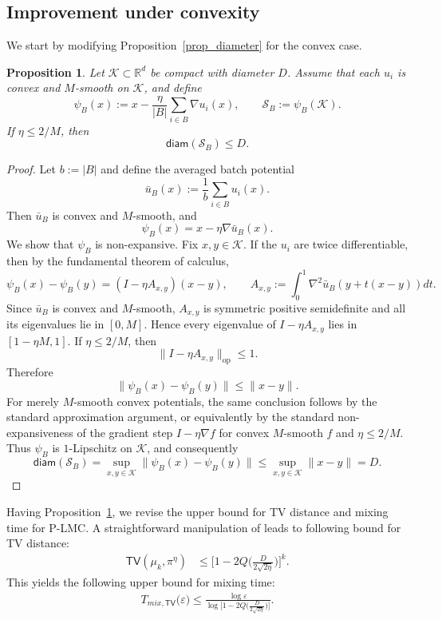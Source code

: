 \documentclass[10pt, journal]{IEEEtran}
\makeatletter
\def\eqref#1{equation~\ref{#1}}
\renewcommand{\eqref}[1]{\textup{\tagform@{\ref{#1}}}}
\newtheorem{proposition}{Proposition}
\makeatother
\begin{document}
\subsection{Improvement under convexity}
\label{app:convex}
We start by modifying Proposition~\ref{prop_diameter} for the convex case.

\begin{proposition}
\label{prop_diameter_convex}
Let $\mathcal K\subset\mathbb R^d$ be compact with diameter $D$. Assume that each $u_i$ is convex and $M$-smooth on $\mathcal K$, and define
$$\psi_B(x):=x-\frac{\eta}{|B|}\sum_{i\in B}\nabla u_i(x),\qquad \mathcal S_B:=\psi_B(\mathcal K).$$
If $\eta\le 2/M$, then
$$\mathsf{diam}(\mathcal S_B)\le D.$$
\end{proposition}
\begin{proof}
Let $b:=|B|$ and define the averaged batch potential
$$\bar u_B(x):=\frac1b\sum_{i\in B}u_i(x).$$
Then $\bar u_B$ is convex and $M$-smooth, and
$$\psi_B(x)=x-\eta\nabla\bar u_B(x).$$
We show that $\psi_B$ is non-expansive. Fix $x,y\in\mathcal K$. If the $u_i$ are twice differentiable, then by the fundamental theorem of calculus,
$$\psi_B(x)-\psi_B(y)=\left(I-\eta A_{x,y}\right)(x-y),\qquad A_{x,y}:=\int_0^1 \nabla^2\bar u_B(y+t(x-y))dt.$$
Since $\bar u_B$ is convex and $M$-smooth, $A_{x,y}$ is symmetric positive semidefinite and all its eigenvalues lie in $[0,M]$. Hence every eigenvalue of $I-\eta A_{x,y}$ lies in $[1-\eta M,1]$. If $\eta\le2/M$, then
$$\|I-\eta A_{x,y}\|_{\mathrm{op}}\le1.$$
Therefore
$$\|\psi_B(x)-\psi_B(y)\|\le \|x-y\|.$$
For merely $M$-smooth convex potentials, the same conclusion follows by the standard approximation argument, or equivalently by the standard non-expansiveness of the gradient step $I-\eta\nabla f$ for convex $M$-smooth $f$ and $\eta\le2/M$.
Thus $\psi_B$ is $1$-Lipschitz on $\mathcal K$, and consequently
$$\mathsf{diam}(\mathcal S_B)=\sup_{x,y\in\mathcal K}\|\psi_B(x)-\psi_B(y)\|\le \sup_{x,y\in\mathcal K}\|x-y\|=D.$$
\end{proof}

Having Proposition~\ref{prop_diameter_convex}, we revise the upper bound for TV distance and mixing time for P-LMC. A straightforward manipulation of \eqref{eq_modify_for_convex} leads to following bound for TV distance:
\begin{align}
    \mathsf{TV}(\mu_{k}, \pi^\eta) &\le \Bigg[1 - 2Q\Big(\frac{D}{2\sqrt{2\eta}}\Big)\Bigg]^k. \nonumber
\end{align}
This yields the following upper bound for mixing time:
\begin{align}
        T_{mix,\mathsf{TV}}\Big(\varepsilon\Big) \le \frac{\log \varepsilon}{\log\Big[1 - 2 Q\big(\frac{D}{2\sqrt{2\eta}}\big)\Big]}. \nonumber
\end{align}
\end{document}
